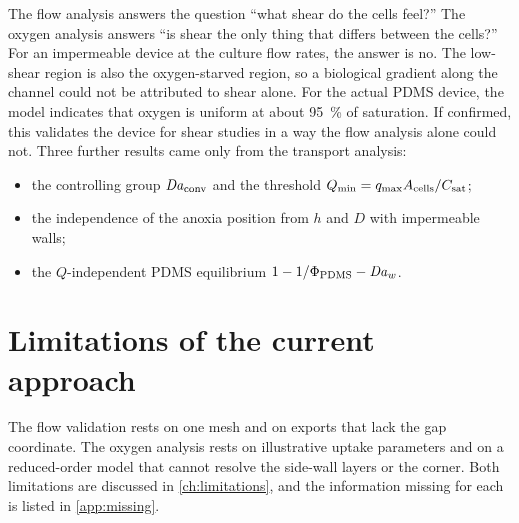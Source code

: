 The flow analysis answers the question ``what shear do the cells feel?'' The oxygen analysis answers ``is shear the only thing that differs between the cells?'' For an impermeable device at the culture flow rates, the answer is no. The low-shear region is also the oxygen-starved region, so a biological gradient along the channel could not be attributed to shear alone. For the actual PDMS device, the model indicates that oxygen is uniform at about \SI{95}{\percent} of saturation. If confirmed, this validates the device for shear studies in a way the flow analysis alone could not. Three further results came only from the transport analysis:
\begin{itemize}
\item the controlling group $\mathit{Da}_{\mathrm{conv}}$ and the threshold $Q_{\min}=q_{\max} A_{\mathrm{cells}}/C_{\mathrm{sat}}$;
\item the independence of the anoxia position from $h$ and $D$ with impermeable walls;
\item the $Q$-independent PDMS equilibrium $1-1/\Phi_{\mathrm{PDMS}}-\mathit{Da}_w$.
\end{itemize}

\section{Limitations of the current approach}

The flow validation rests on one mesh and on exports that lack the gap coordinate. The oxygen analysis rests on illustrative uptake parameters and on a reduced-order model that cannot resolve the side-wall layers or the corner. Both limitations are discussed in \cref{ch:limitations}, and the information missing for each is listed in \cref{app:missing}.
